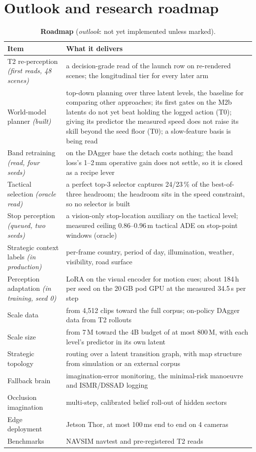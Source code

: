 \documentclass[10pt,twocolumn]{article}
\theoremstyle{remark}
\newcommand{\tier}[1]{\textsc{\small #1}}
\begin{document}
\section{Outlook and research roadmap}\label{sec:outlook}
\begin{table}[t]
\centering
\caption{\textbf{Roadmap} (\emph{outlook}: not yet implemented unless marked).}
\label{tab:roadmap}
\small
\begin{tabularx}{\columnwidth}{@{}>{\raggedright\arraybackslash}p{24mm}>{\raggedright\arraybackslash}X@{}}
\toprule
Item & What it delivers \\
\midrule
T2 re-perception \textit{(first reads, 48 scenes)} & a decision-grade read of the launch row on re-rendered scenes; the longitudinal tier for every later arm \\
World-model planner \textit{(built)} & top-down planning over three latent levels, the baseline for comparing other approaches; its first gates on the M2b latents do not yet beat holding the logged action (\tier{T0}); giving its predictor the measured speed does not raise its skill beyond the seed floor (\tier{T0}); a slow-feature basis is being read \\
Band retraining \textit{(read, four seeds)} & on the DAgger base the detach costs nothing; the band loss's 1--2\,mm operative gain does not settle, so it is closed as a recipe lever \\
Tactical selection \textit{(oracle read)} & a perfect top-3 selector captures 24/23\,\% of the best-of-three headroom; the headroom sits in the speed constraint, so no selector is built \\
Stop perception \textit{(queued, two seeds)} & a vision-only stop-location auxiliary on the tactical level; measured ceiling 0.86--0.96\,m tactical ADE on stop-point windows (oracle) \\
Strategic context labels \textit{(in production)} & per-frame country, period of day, illumination, weather, visibility, road surface \\
Perception adaptation \textit{(in training, seed 0)} & LoRA on the visual encoder for motion cues; about 184\,h per seed on the 20\,GB pod GPU at the measured 34.5\,s per step \\
Scale data & from 4,512 clips toward the full corpus; on-policy DAgger data from T2 rollouts \\
Scale size & from 7\,M toward the 4B budget of at most 800\,M, with each level's predictor in its own latent \\
Strategic topology & routing over a latent transition graph, with map structure from simulation or an external corpus \\
Fallback brain & imagination-error monitoring, the minimal-risk manoeuvre and ISMR/DSSAD logging \\
Occlusion imagination & multi-step, calibrated belief roll-out of hidden sectors \\
Edge deployment & Jetson Thor, at most 100\,ms end to end on 4 cameras \\
Benchmarks & NAVSIM navtest and pre-registered T2 reads \\
\bottomrule
\end{tabularx}
\end{table}
\end{document}
